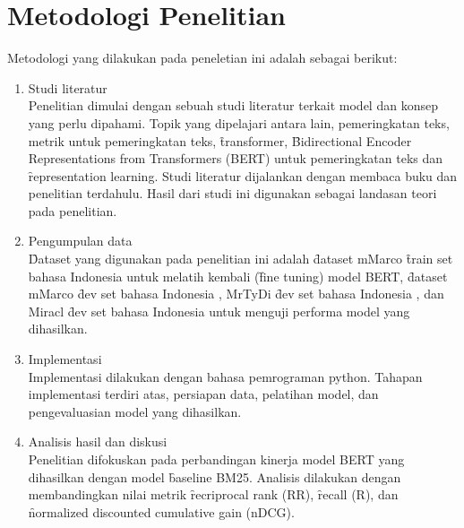 \section{Metodologi Penelitian}
Metodologi yang dilakukan pada peneletian ini adalah sebagai berikut:
\begin{enumerate}
	\item Studi literatur \\
	Penelitian dimulai dengan sebuah studi literatur terkait model dan konsep yang perlu dipahami. Topik yang dipelajari antara lain, pemeringkatan teks, metrik untuk pemeringkatan teks, \f{transformer}, \f{Bidirectional Encoder Representations from Transformers} (BERT) untuk pemeringkatan teks dan \f{representation learning}. Studi literatur dijalankan dengan membaca buku dan penelitian terdahulu. Hasil dari studi ini digunakan sebagai landasan teori pada penelitian.
	\item Pengumpulan data \\
	\f{Dataset} yang digunakan pada penelitian ini adalah \f{dataset} mMarco \f{train set} bahasa Indonesia \citep{mmarco} untuk melatih kembali (\f{fine tuning}) model BERT, \f{dataset} mMarco \f{dev set} bahasa Indonesia \citep{mmarco}, MrTyDi \f{dev set} bahasa Indonesia \citep{mrtydi}, dan Miracl \f{dev set} bahasa Indonesia \citep{miracl} untuk menguji performa model yang dihasilkan.
	\item Implementasi \\
	Implementasi dilakukan dengan bahasa pemrograman python. Tahapan implementasi terdiri atas, persiapan data, pelatihan model, dan pengevaluasian model yang dihasilkan.
	\item Analisis hasil dan diskusi \\
	Penelitian difokuskan pada perbandingan kinerja model BERT yang dihasilkan dengan model \f{baseline} BM25. Analisis dilakukan dengan membandingkan nilai metrik \f{recriprocal rank} (RR), \f{recall} (R), dan \f{normalized discounted cumulative gain} (nDCG).
\end{enumerate}

